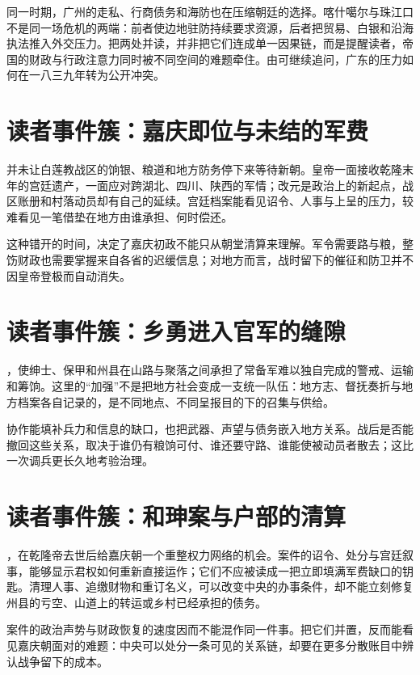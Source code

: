 同一时期，广州的走私、行商债务和海防也在压缩朝廷的选择。喀什噶尔与珠江口不是同一场危机的两端：前者使边地驻防持续要求资源，后者把贸易、白银和沿海执法推入外交压力。把两处并读，并非把它们连成单一因果链，而是提醒读者，帝国的财政与行政注意力同时被不同空间的难题牵住。由可继续追问，广东的压力如何在一八三九年转为公开冲突。

\section{读者事件簇：嘉庆即位与未结的军费}

并未让白莲教战区的饷银、粮道和地方防务停下来等待新朝。皇帝一面接收乾隆末年的宫廷遗产，一面应对跨湖北、四川、陕西的军情；改元是政治上的新起点，战区账册和村落动员却有自己的延续。宫廷档案能看见诏令、人事与上呈的压力，较难看见一笔借垫在地方由谁承担、何时偿还。

这种错开的时间，决定了嘉庆初政不能只从朝堂清算来理解。军令需要路与粮，整饬财政也需要掌握来自各省的迟缓信息；对地方而言，战时留下的催征和防卫并不因皇帝登极而自动消失。

\section{读者事件簇：乡勇进入官军的缝隙}

，使绅士、保甲和州县在山路与聚落之间承担了常备军难以独自完成的警戒、运输和筹饷。这里的“加强”不是把地方社会变成一支统一队伍：地方志、督抚奏折与地方档案各自记录的，是不同地点、不同呈报目的下的召集与供给。

协作能填补兵力和信息的缺口，也把武器、声望与债务嵌入地方关系。战后是否能撤回这些关系，取决于谁仍有粮饷可付、谁还要守路、谁能使被动员者散去；这比一次调兵更长久地考验治理。

\section{读者事件簇：和珅案与户部的清算}

，在乾隆帝去世后给嘉庆朝一个重整权力网络的机会。案件的诏令、处分与宫廷叙事，能够显示君权如何重新直接运作；它们不应被读成一把立即填满军费缺口的钥匙。清理人事、追缴财物和重订名义，可以改变中央的办事条件，却不能立刻修复州县的亏空、山道上的转运或乡村已经承担的债务。

案件的政治声势与财政恢复的速度因而不能混作同一件事。把它们并置，反而能看见嘉庆朝面对的难题：中央可以处分一条可见的关系链，却要在更多分散账目中辨认战争留下的成本。

